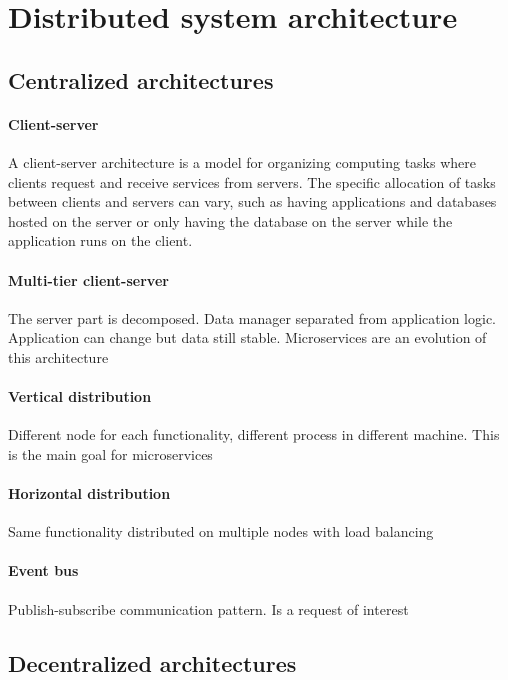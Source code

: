 \section{Distributed system architecture}

\subsection{Centralized architectures}
\paragraph{Client-server}
A client-server architecture is a model for organizing computing tasks where clients request and receive services from servers. The specific allocation of tasks between clients and servers can vary, such as having applications and databases hosted on the server or only having the database on the server while the application runs on the client.

\paragraph{Multi-tier client-server}
The server part is decomposed. Data manager
separated from application logic. Application can change but data still stable. Microservices are an evolution of this architecture

\paragraph{Vertical distribution}
Different node for each functionality, different process in different machine. This
is the main goal for microservices

\paragraph{Horizontal distribution}
Same functionality distributed on multiple nodes with
load balancing

\paragraph{Event bus} 
Publish-subscribe communication pattern. Is a request of interest


\subsection{Decentralized architectures}

